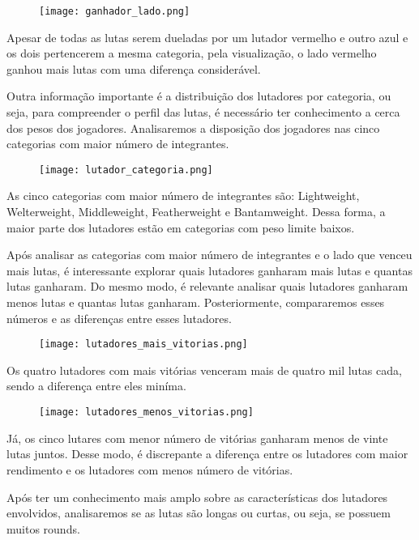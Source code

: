 \documentclass{article}
\begin{document}
\begin{figure}[H] 
    \centering 
    \texttt{[image: ganhador\_lado.png]} 
\end{figure}

\par Apesar de todas as lutas serem dueladas por um lutador vermelho e outro azul e os dois pertencerem a mesma categoria, pela visualização, o lado vermelho ganhou mais lutas com uma diferença considerável.
\par Outra informação importante é a distribuição dos lutadores por categoria, ou seja, para compreender o perfil das lutas, é necessário  ter conhecimento a cerca dos pesos dos jogadores. Analisaremos a disposição dos jogadores nas cinco categorias com maior número de integrantes.
    
\begin{figure}[H] 
    \centering 
    \texttt{[image: lutador\_categoria.png]} 
\end{figure}

\par As cinco categorias com maior número de integrantes são: Lightweight, Welterweight, Middleweight, Featherweight e Bantamweight. Dessa forma, a maior parte dos lutadores estão em categorias com peso limite baixos.
\par Após analisar as categorias com maior número de integrantes e o lado que venceu mais lutas, é interessante explorar quais lutadores ganharam mais lutas e quantas lutas ganharam. Do mesmo modo, é relevante analisar quais lutadores ganharam menos lutas e quantas lutas ganharam. Posteriormente, compararemos esses números e as diferenças entre esses lutadores.
    
\begin{figure}[H] 
    \centering 
    \texttt{[image: lutadores\_mais\_vitorias.png]} 
\end{figure}
  
\par Os quatro lutadores com mais vitórias venceram mais de quatro mil lutas cada, sendo a diferença entre eles miníma. 

\begin{figure}[H] 
    \centering 
    \texttt{[image: lutadores\_menos\_vitorias.png]} 
\end{figure}

\par Já, os cinco lutares com menor número de vitórias ganharam menos de vinte lutas juntos. Desse modo, é discrepante a diferença entre os lutadores com maior rendimento e os lutadores com menos número de vitórias.
\par Após ter um conhecimento mais amplo sobre as características dos lutadores envolvidos, analisaremos se as lutas são longas ou curtas, ou seja, se possuem muitos rounds.
\end{document}
